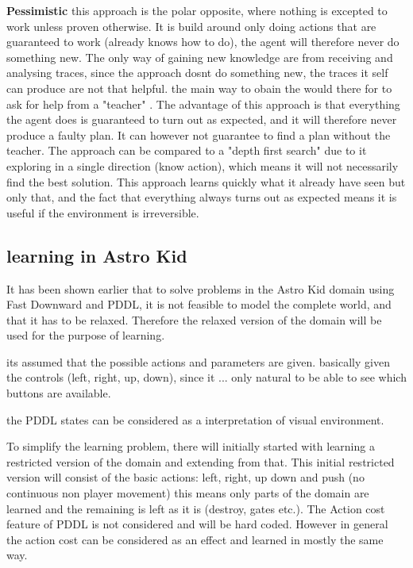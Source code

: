 	\textbf{Pessimistic} this approach is the polar opposite, where nothing is excepted to work unless proven otherwise. It is build around only doing actions that are guaranteed to work (already knows how to do), the agent will therefore never do something new. The only way of gaining new knowledge are from receiving and analysing traces, since the approach dosnt do something new, the traces it self can produce are not that helpful. the main way to obain the would there for to ask for help from a "teacher" \cite{Action-Schemas}.
	The advantage of this approach is that everything the agent does is guaranteed to turn out as expected, and it will therefore never produce a faulty plan. It can however not guarantee to find a plan without the teacher. The approach can be compared to a "depth first search" due to it exploring in a single direction (know action), which means it will not necessarily find the best solution. 
	This approach learns quickly what it already have seen but only that, and the fact that everything always turns out as expected means it is useful if the environment is irreversible.
	
	

	
		
		
	
	\subsection{learning in Astro Kid}
	It has been shown earlier that to solve problems in the Astro Kid domain using Fast Downward and PDDL, it is not feasible to model the complete world, and that it has to be relaxed. Therefore the relaxed version of the domain will be used for the purpose of learning.
	
	its assumed that the possible actions and parameters are given. basically given the controls (left, right, up, down), since it ... only natural to be able to see which buttons are available.
	
	the PDDL states can be considered as a interpretation of visual environment.
	
	
	To simplify the learning problem, there will initially started with learning a restricted version of the domain and extending from that. This initial restricted version will consist of the basic actions: left, right, up down and push (no continuous non player movement)
	this means only parts of the domain are learned and the remaining is left as it is (destroy, gates etc.). The Action cost feature of PDDL is not considered and will be hard coded. However in general the action cost can be considered as an effect and learned in mostly the same way.

